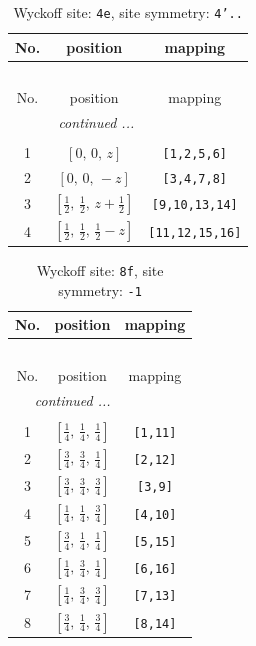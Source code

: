 \documentclass[fleqn,8pt]{jsarticle}
\begin{document}
\renewcommand{\arraystretch}{1.2}
\begin{longtable}{ccc}
\caption{Wyckoff site: {\tt 4e}, site symmetry: {\tt 4'..}}
 \\
 \hline \hline
No. & position & mapping \\ \hline \endfirsthead

\multicolumn{2}{l}{\tablename\ \thetable{}} \\
 \hline \hline
No. & position & mapping \\ \hline \endhead

 \hline \hline
\multicolumn{2}{r}{\footnotesize\it continued ...} \\ \endfoot

 \hline \hline
\multicolumn{2}{r}{} \\ \endlastfoot

1 & $\left[ 0,\, 0,\, z \right]$ & {\tt [1,2,5,6]} \\ \hline
2 & $\left[ 0,\, 0,\, - z \right]$ & {\tt [3,4,7,8]} \\ \hline
3 & $\left[ \frac{1}{2},\, \frac{1}{2},\, z + \frac{1}{2} \right]$ & {\tt [9,10,13,14]} \\ \hline
4 & $\left[ \frac{1}{2},\, \frac{1}{2},\, \frac{1}{2} - z \right]$ & {\tt [11,12,15,16]} \\
\end{longtable}
\renewcommand{\arraystretch}{1.2}
\begin{longtable}{ccc}
\caption{Wyckoff site: {\tt 8f}, site symmetry: {\tt -1}}
 \\
 \hline \hline
No. & position & mapping \\ \hline \endfirsthead

\multicolumn{2}{l}{\tablename\ \thetable{}} \\
 \hline \hline
No. & position & mapping \\ \hline \endhead

 \hline \hline
\multicolumn{2}{r}{\footnotesize\it continued ...} \\ \endfoot

 \hline \hline
\multicolumn{2}{r}{} \\ \endlastfoot

1 & $\left[ \frac{1}{4},\, \frac{1}{4},\, \frac{1}{4} \right]$ & {\tt [1,11]} \\ \hline
2 & $\left[ \frac{3}{4},\, \frac{3}{4},\, \frac{1}{4} \right]$ & {\tt [2,12]} \\ \hline
3 & $\left[ \frac{3}{4},\, \frac{3}{4},\, \frac{3}{4} \right]$ & {\tt [3,9]} \\ \hline
4 & $\left[ \frac{1}{4},\, \frac{1}{4},\, \frac{3}{4} \right]$ & {\tt [4,10]} \\ \hline
5 & $\left[ \frac{3}{4},\, \frac{1}{4},\, \frac{1}{4} \right]$ & {\tt [5,15]} \\ \hline
6 & $\left[ \frac{1}{4},\, \frac{3}{4},\, \frac{1}{4} \right]$ & {\tt [6,16]} \\ \hline
7 & $\left[ \frac{1}{4},\, \frac{3}{4},\, \frac{3}{4} \right]$ & {\tt [7,13]} \\ \hline
8 & $\left[ \frac{3}{4},\, \frac{1}{4},\, \frac{3}{4} \right]$ & {\tt [8,14]} \\
\end{longtable}
\end{document}

